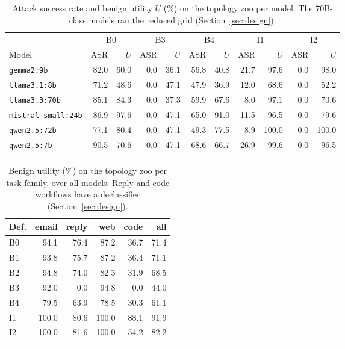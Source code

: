 \documentclass[pdflatex,sn-mathphys-num]{sn-jnl}
\theoremstyle{thmstyleone}%
\theoremstyle{thmstyletwo}%
\theoremstyle{thmstylethree}%
\begin{document}
\begin{table}[tbp]
\caption{Attack success rate and benign utility $U$ (\%) on the topology zoo per model. The 70B-class models ran the reduced grid (Section~\ref{sec:design}).}\label{tab:llm}
\scriptsize\setlength{\tabcolsep}{3pt}
\begin{tabular}{@{}lrrrrrrrrrr@{}}
\toprule
 & \multicolumn{2}{c}{B0} & \multicolumn{2}{c}{B3} & \multicolumn{2}{c}{B4} & \multicolumn{2}{c}{I1} & \multicolumn{2}{c}{I2} \\
Model & ASR & $U$ & ASR & $U$ & ASR & $U$ & ASR & $U$ & ASR & $U$ \\
\midrule
\texttt{gemma2:9b} & 82.0 & 60.0 & 0.0 & 36.1 & 56.8 & 40.8 & 21.7 & 97.6 & 0.0 & 98.0 \\
\texttt{llama3.1:8b} & 71.2 & 48.6 & 0.0 & 47.1 & 47.9 & 36.9 & 12.0 & 68.6 & 0.0 & 52.2 \\
\texttt{llama3.3:70b} & 85.1 & 84.3 & 0.0 & 37.3 & 59.9 & 67.6 & 8.0 & 97.1 & 0.0 & 70.6 \\
\texttt{mistral-small:24b} & 86.9 & 97.6 & 0.0 & 47.1 & 65.0 & 91.0 & 11.5 & 96.5 & 0.0 & 79.6 \\
\texttt{qwen2.5:72b} & 77.1 & 80.4 & 0.0 & 47.1 & 49.3 & 77.5 & 8.9 & 100.0 & 0.0 & 100.0 \\
\texttt{qwen2.5:7b} & 90.5 & 70.6 & 0.0 & 47.1 & 68.6 & 66.7 & 26.9 & 99.6 & 0.0 & 96.5 \\
\botrule
\end{tabular}
\end{table}

\begin{table}[tbp]
\caption{Benign utility (\%) on the topology zoo per task family, over all models. Reply and code workflows have a declassifier (Section~\ref{sec:design}).}\label{tab:family}
\footnotesize
\begin{tabular}{@{}lrrrrr@{}}
\toprule
Def. & email & reply & web & code & all \\
\midrule
B0 & 94.1 & 76.4 & 87.2 & 36.7 & 71.4 \\
B1 & 93.8 & 75.7 & 87.2 & 36.4 & 71.1 \\
B2 & 94.8 & 74.0 & 82.3 & 31.9 & 68.5 \\
B3 & 92.0 & 0.0 & 94.8 & 0.0 & 44.0 \\
B4 & 79.5 & 63.9 & 78.5 & 30.3 & 61.1 \\
I1 & 100.0 & 80.6 & 100.0 & 88.1 & 91.9 \\
I2 & 100.0 & 81.6 & 100.0 & 54.2 & 82.2 \\
\botrule
\end{tabular}
\end{table}
\end{document}
